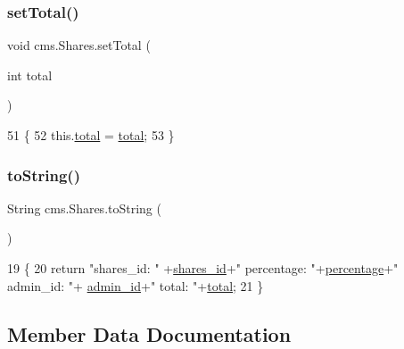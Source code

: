 \subsubsection{\texorpdfstring{set\+Total()}{setTotal()}}
{\footnotesize\ttfamily void cms.\+Shares.\+set\+Total (\begin{DoxyParamCaption}\item[{int}]{total }\end{DoxyParamCaption})\hspace{0.3cm}{\ttfamily [inline]}}


\begin{DoxyCode}
51                                     \{
52         this.\mbox{\hyperlink{classcms_1_1_shares_ab40a204e3f87bf0f315888a9040a8681}{total}} = \mbox{\hyperlink{classcms_1_1_shares_ab40a204e3f87bf0f315888a9040a8681}{total}};
53     \}
\end{DoxyCode}
\mbox{\label{classcms_1_1_shares_a6b6665eacebf3aab93e80e972d160610}} 
\subsubsection{\texorpdfstring{to\+String()}{toString()}}
{\footnotesize\ttfamily String cms.\+Shares.\+to\+String (\begin{DoxyParamCaption}{ }\end{DoxyParamCaption})\hspace{0.3cm}{\ttfamily [inline]}}


\begin{DoxyCode}
19                             \{
20         \textcolor{keywordflow}{return}  \textcolor{stringliteral}{"shares\_id: "} +\mbox{\hyperlink{classcms_1_1_shares_a15e43f7e31f2c147893fc92c4a94037a}{shares\_id}}+\textcolor{stringliteral}{" percentage: "}+\mbox{\hyperlink{classcms_1_1_shares_a7235d21d3198a5acbd0135d6486e6f51}{percentage}}+\textcolor{stringliteral}{" admin\_id: "}+
      \mbox{\hyperlink{classcms_1_1_shares_a04c23ccc0ceb9f01dad2e5cb65cbc7e6}{admin\_id}}+\textcolor{stringliteral}{" total: "}+\mbox{\hyperlink{classcms_1_1_shares_ab40a204e3f87bf0f315888a9040a8681}{total}};
21     \}
\end{DoxyCode}


\subsection{Member Data Documentation}
\mbox{\label{classcms_1_1_shares_a04c23ccc0ceb9f01dad2e5cb65cbc7e6}} 
